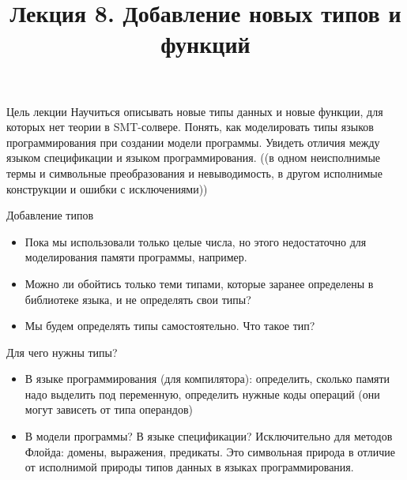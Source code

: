 \documentclass[hyperref={unicode=true}]{beamer}
\title{Лекция 8. Добавление новых типов и функций}
\author{}
\date{}
\begin{document}
	\begin{frame}{}
		\titlepage
	\end{frame}

    \begin{frame}{Цель лекции}
    Научиться описывать новые типы данных и
    новые функции, для которых нет теории в SMT-солвере.
    Понять, как моделировать типы языков
    программирования при создании модели программы.
    Увидеть отличия между языком спецификации и
    языком программирования. ((в одном неисполнимые термы и
                символьные преобразования и невыводимость,
                в другом исполнимые конструкции и ошибки с исключениями))
    \end{frame}



    \begin{frame}{Добавление типов}
    \begin{itemize}
    \item
    Пока мы использовали только целые числа, но этого
    недостаточно для моделирования памяти программы, например.
    \item
    Можно ли обойтись только теми типами, которые заранее
    определены в библиотеке языка, и не определять свои типы?
    \item
    Мы будем определять типы самостоятельно. Что такое тип?
    \end{itemize}
    \end{frame}

    \begin{frame}{Для чего нужны типы?}
    \begin{itemize}
    \item
    В языке программирования (для компилятора):
    определить, сколько памяти надо выделить под переменную,
    определить нужные коды операций (они могут зависеть
            от типа операндов)
    \item
    В модели программы?
    В языке спецификации?
    Исключительно для методов Флойда: домены, выражения,
    предикаты. Это символьная природа в отличие от
    исполнимой природы типов данных в языках программирования.
    \end{itemize}
    \end{frame}
\end{document}
